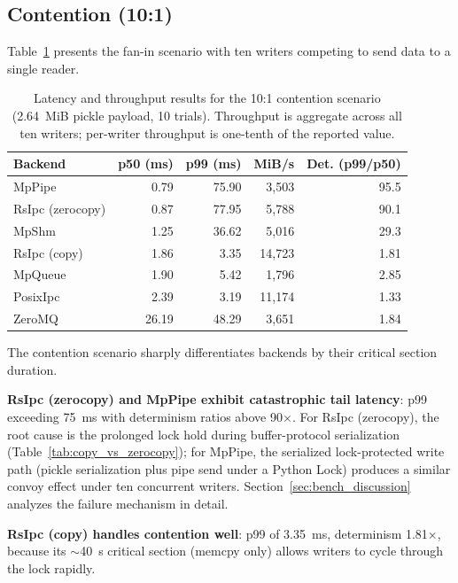 \subsection{Contention (10:1)}
\label{subsec:contention_results}

Table~\ref{tab:contention_101} presents the fan-in scenario with ten writers competing to send data to a single reader.

\begin{table}[htbp]
    \centering
    \caption{Latency and throughput results for the 10:1 contention scenario (2.64~MiB pickle payload, 10 trials). Throughput is aggregate across all ten writers; per-writer throughput is one-tenth of the reported value.}
    \label{tab:contention_101}
    \begin{tabular}{lrrrr}
        \hline
        \textbf{Backend} & \textbf{p50 (ms)} & \textbf{p99 (ms)} & \textbf{MiB/s} & \textbf{Det. (p99/p50)} \\
        \hline
        MpPipe & 0.79 & 75.90 & 3,503 & 95.5 \\
        RsIpc (zerocopy) & 0.87 & 77.95 & 5,788 & 90.1 \\
        MpShm & 1.25 & 36.62 & 5,016 & 29.3 \\
        RsIpc (copy) & 1.86 & 3.35 & 14,723 & 1.81 \\
        MpQueue & 1.90 & 5.42 & 1,796 & 2.85 \\
        PosixIpc & 2.39 & 3.19 & 11,174 & 1.33 \\
        ZeroMQ & 26.19 & 48.29 & 3,651 & 1.84 \\
        \hline
    \end{tabular}
\end{table}

The contention scenario sharply differentiates backends by their critical section duration.

\textbf{RsIpc (zerocopy) and MpPipe exhibit catastrophic tail latency}: p99 exceeding 75~ms with determinism ratios above 90$\times$. For RsIpc (zerocopy), the root cause is the prolonged lock hold during buffer-protocol serialization (Table~\ref{tab:copy_vs_zerocopy}); for MpPipe, the serialized lock-protected write path (pickle serialization plus pipe send under a Python Lock) produces a similar convoy effect under ten concurrent writers. Section~\ref{sec:bench_discussion} analyzes the failure mechanism in detail.

\textbf{RsIpc (copy) handles contention well}: p99 of 3.35~ms, determinism 1.81$\times$, because its $\sim$40~\textmu s critical section (memcpy only) allows writers to cycle through the lock rapidly.


